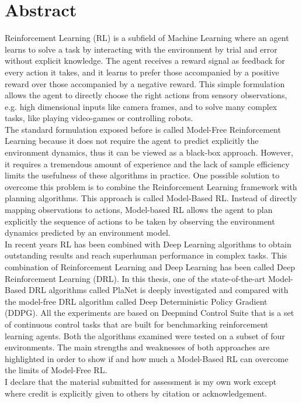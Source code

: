 \chapter*{Abstract}

Reinforcement Learning (RL) is a subfield of Machine Learning where an agent learns to solve a task by interacting with the environment by trial and error without explicit knowledge. The agent receives a reward signal as feedback for every action it takes, and it learns to prefer those accompanied by a positive reward over those accompanied by a negative reward. 
This simple formulation allows the agent to directly choose the right actions from sensory observations, e.g. high dimensional inputs like camera frames, and to solve many complex tasks, like playing video-games or controlling robots.  \\ 
The standard formulation exposed before is called Model-Free Reinforcement Learning because it does not require the agent to predict explicitly the environment dynamics, thus it can be viewed as a black-box approach. However, it requires a tremendous amount of experience and the lack of sample efficiency limits the usefulness of these algorithms in practice. 
One possible solution to overcome this problem is to combine the Reinforcement Learning framework with planning algorithms. 
This approach is called Model-Based RL.
Instead of directly mapping observations to actions, Model-based RL allows the agent to plan explicitly the sequence of actions to be taken by observing the environment dynamics predicted by an environment model. \\
In recent years RL has been combined with Deep Learning algorithms to obtain outstanding results and reach superhuman performance in complex tasks. This combination of Reinforcement Learning and Deep Learning has been called Deep Reinforcement Learning (DRL).
In this thesis, one of the state-of-the-art Model-Based DRL algorithms called PlaNet is deeply investigated and compared with the model-free DRL algorithm called Deep Deterministic Policy Gradient (DDPG). 
All the experiments are based on Deepmind Control Suite that is a set of continuous control tasks that are built for benchmarking reinforcement learning agents. Both the algorithms examined were tested on a subset of four environments.
The main strengths and weaknesses of both approaches are highlighted in order to show if and how much a Model-Based RL can overcome the limits of Model-Free RL.\\

I declare that the material submitted for assessment is my own work except where credit is explicitly given to others by citation or acknowledgement.
